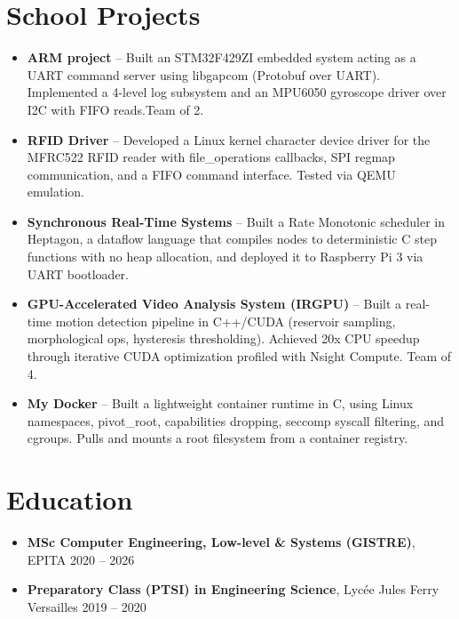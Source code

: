 \documentclass[9pt,a4paper]{article}
\begin{document}
\section*{School Projects}
\begin{tcolorbox}[mybox]
\begin{itemize}
\item \textbf{ARM project} -- Built an STM32F429ZI embedded system acting as a UART command server using libgapcom (Protobuf over UART). Implemented a 4-level log subsystem and an MPU6050 gyroscope driver over I2C with FIFO reads.Team of 2.

\item \textbf{RFID Driver} -- Developed a Linux kernel character device driver for the MFRC522 RFID reader with file\_operations callbacks, SPI regmap communication, and a FIFO command interface. Tested via QEMU emulation.

\item \textbf{Synchronous Real-Time Systems} -- Built a Rate Monotonic scheduler in Heptagon, a dataflow language that compiles nodes to deterministic C step functions with no heap allocation, and deployed it to Raspberry Pi 3 via UART bootloader.

\item \textbf{GPU-Accelerated Video Analysis System (IRGPU)} -- Built a real-time motion detection pipeline in C++/CUDA (reservoir sampling, morphological ops, hysteresis thresholding). Achieved 20x CPU speedup through iterative CUDA optimization profiled with Nsight Compute. Team of 4.

\item \textbf{My Docker} -- Built a lightweight container runtime in C, using Linux namespaces, pivot\_root, capabilities dropping, seccomp syscall filtering, and cgroups. Pulls and mounts a root filesystem from a container registry.
\end{itemize}
\end{tcolorbox}


\section*{Education}
\begin{tcolorbox}[mybox]
\begin{itemize}
\item \textbf{MSc Computer Engineering, Low-level \& Systems (GISTRE)}, EPITA {\small{\hfill 2020 – 2026}}

\item \textbf{Preparatory Class (PTSI) in Engineering Science}, Lycée Jules Ferry Versailles {\small{\hfill 2019 – 2020}}
\end{itemize}
\end{tcolorbox}
\end{document}
